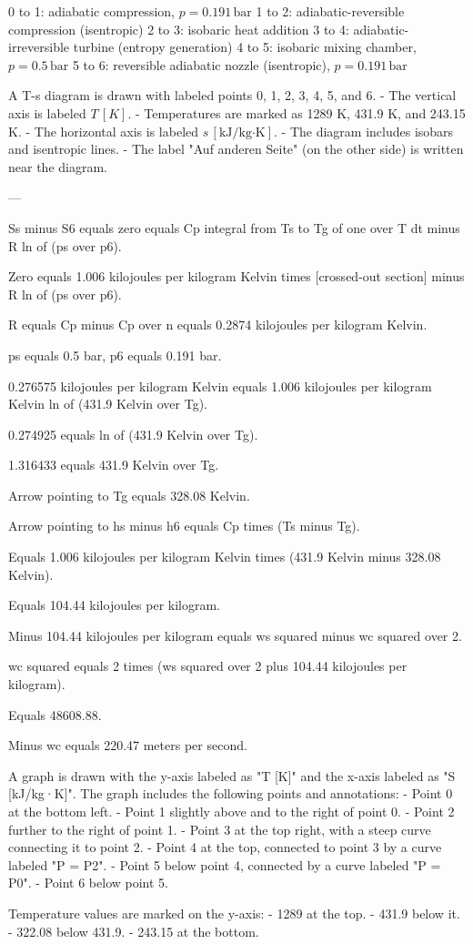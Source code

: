 0 to 1: adiabatic compression, \( p = 0.191 \, \text{bar} \)  
1 to 2: adiabatic-reversible compression (isentropic)  
2 to 3: isobaric heat addition  
3 to 4: adiabatic-irreversible turbine (entropy generation)  
4 to 5: isobaric mixing chamber, \( p = 0.5 \, \text{bar} \)  
5 to 6: reversible adiabatic nozzle (isentropic), \( p = 0.191 \, \text{bar} \)  

A T-s diagram is drawn with labeled points 0, 1, 2, 3, 4, 5, and 6.  
- The vertical axis is labeled \( T \, [K] \).  
- Temperatures are marked as 1289 K, 431.9 K, and 243.15 K.  
- The horizontal axis is labeled \( s \, [\text{kJ/kg·K}] \).  
- The diagram includes isobars and isentropic lines.  
- The label "Auf anderen Seite" (on the other side) is written near the diagram.  

---

Ss minus S6 equals zero equals Cp integral from Ts to Tg of one over T dt minus R ln of (ps over p6).  

Zero equals 1.006 kilojoules per kilogram Kelvin times [crossed-out section] minus R ln of (ps over p6).  

R equals Cp minus Cp over n equals 0.2874 kilojoules per kilogram Kelvin.  

ps equals 0.5 bar, p6 equals 0.191 bar.  

0.276575 kilojoules per kilogram Kelvin equals 1.006 kilojoules per kilogram Kelvin ln of (431.9 Kelvin over Tg).  

0.274925 equals ln of (431.9 Kelvin over Tg).  

1.316433 equals 431.9 Kelvin over Tg.  

Arrow pointing to Tg equals 328.08 Kelvin.  

Arrow pointing to hs minus h6 equals Cp times (Ts minus Tg).  

Equals 1.006 kilojoules per kilogram Kelvin times (431.9 Kelvin minus 328.08 Kelvin).  

Equals 104.44 kilojoules per kilogram.  

Minus 104.44 kilojoules per kilogram equals ws squared minus wc squared over 2.  

wc squared equals 2 times (ws squared over 2 plus 104.44 kilojoules per kilogram).  

Equals 48608.88.  

Minus wc equals 220.47 meters per second.

A graph is drawn with the y-axis labeled as "T [K]" and the x-axis labeled as "S [kJ/kg·K]".  
The graph includes the following points and annotations:  
- Point 0 at the bottom left.  
- Point 1 slightly above and to the right of point 0.  
- Point 2 further to the right of point 1.  
- Point 3 at the top right, with a steep curve connecting it to point 2.  
- Point 4 at the top, connected to point 3 by a curve labeled "P = P2".  
- Point 5 below point 4, connected by a curve labeled "P = P0".  
- Point 6 below point 5.  

Temperature values are marked on the y-axis:  
- 1289 at the top.  
- 431.9 below it.  
- 322.08 below 431.9.  
- 243.15 at the bottom.
